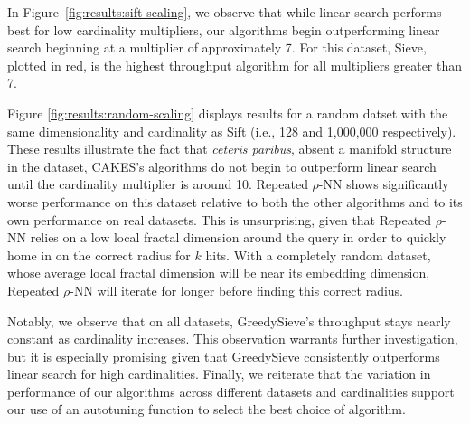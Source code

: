 In Figure~\ref{fig:results:sift-scaling}, we observe that while linear search performs best for low cardinality multipliers, our algorithms begin outperforming linear search beginning at a multiplier of approximately 7. 
For this dataset, Sieve, plotted in red, is the highest throughput algorithm for all multipliers greater than 7. 

Figure \ref{fig:results:random-scaling} displays results for a random datset with the same dimensionality and cardinality as Sift (i.e., 128 and 1,000,000 respectively). 
These results illustrate the fact that \emph{ceteris paribus}, absent a manifold structure in the dataset, CAKES's algorithms do not begin to outperform linear search until the cardinality multiplier is around 10. 
Repeated $\rho$-NN shows significantly worse performance on this dataset relative to both the other algorithms and to its own performance on real datasets. 
This is unsurprising, given that Repeated $\rho$-NN relies on a low local fractal dimension around the query in order to quickly home in on the correct radius for $k$ hits. 
With a completely random dataset, whose average local fractal dimension will be near its embedding dimension, Repeated $\rho$-NN will iterate for longer before finding this correct radius. 

Notably, we observe that on all datasets, GreedySieve's throughput stays nearly constant as cardinality increases. This observation warrants further investigation, but it is especially promising given that GreedySieve consistently outperforms linear search for high cardinalities. 
Finally, we reiterate that the variation in performance of our algorithms across different datasets and cardinalities support our use of an autotuning function to select the best choice of algorithm. 

% 

